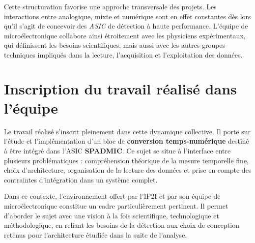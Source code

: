 Cette structuration favorise une approche transversale des projets. Les interactions entre analogique, mixte et numérique sont en effet constantes dès lors qu’il s’agit de concevoir des \textit{ASIC} de détection à haute performance. L’équipe de microélectronique collabore ainsi étroitement avec les physiciens expérimentaux, qui définissent les besoins scientifiques, mais aussi avec les autres groupes techniques impliqués dans la lecture, l’acquisition et l’exploitation des données.

\section{Inscription du travail réalisé dans l’équipe}

Le travail réalisé s’inscrit pleinement dans cette dynamique collective. Il porte sur l’étude et l’implémentation d’un bloc de \textbf{conversion temps-numérique} destiné à être intégré dans l’ASIC \textbf{SPADMIC}. Ce sujet se situe à l’interface entre plusieurs problématiques : compréhension théorique de la mesure temporelle fine, choix d’architecture, organisation de la lecture des données et prise en compte des contraintes d’intégration dans un système complet.

Dans ce contexte, l’environnement offert par l’IP2I et par son équipe de microélectronique constitue un cadre particulièrement pertinent. Il permet d’aborder le sujet avec une vision à la fois scientifique, technologique et méthodologique, en reliant les besoins de la détection aux choix de conception retenus pour l’architecture étudiée dans la suite de l'analyse.

\clearpage
